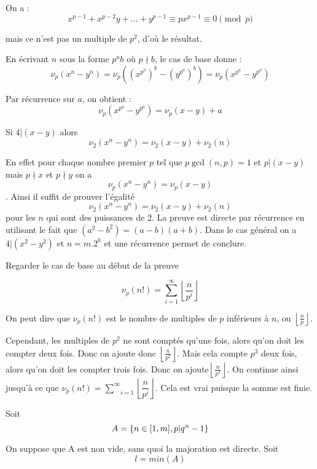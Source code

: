 On a :
\[ x^{p - 1} + x^{p - 2} y + \ldots + y^{p - 1} \equiv px^{p - 1} \equiv 0
   \pmod{p} \]


mais ce n'est pas un multiple de $p^2$, d'o{\`u} le r{\'e}sultat.

En {\'e}crivant $n$ sous la forme $p^a b$ o{\`u} $p \nmid b$, le cas de base
donne :
\[ \nu_p  (x^n - y^n) = \nu_p  ((x^{p^a})^b - (y^{p^a})^b) = \nu_p  (x^{p^a} -
   y^{p^a}) \]


Par r{\'e}currence sur $a$, on obtient :
\[ \nu_p  (x^{p^a} - y^{p^a}) = \nu_p  (x - y) + a \]



Si $4| (x - y)$ alors
\[ \nu_2  (x^n - y^n) = \nu_2 (x - y) + \nu_2 (n) \]


En effet pour chaque nombre premier $p$ tel que $p \gcd (n, p) = 1$ et $p| (x
- y)$ mais $p \nmid x$ et $p \nmid y$ on a
\[ \nu_p  (x^n - y^n) = \nu_p  (x - y) \]
. Ainsi il suffit de prouver l'{\'e}galit{\'e}
\[ \nu_2  (x^n - y^n) = \nu_2 (x - y) + \nu_2 (n) \]
pour les $n$ qui sont des puissances de 2. La preuve est directe par
r{\'e}currence en utilisant le fait que $(a^2 - b^2) = (a - b)  (a + b)$. Dans
le cas g{\'e}n{\'e}ral on a $4| (x^2 - y^2)$ et $n = m. 2^k$ et une
r{\'e}currence permet de conclure.


Regarder le cas de base au d{\'e}but de la preuve

\[ \nu_p (n!) = \sum_{i = 1}^{\infty} \left\lfloor \dfrac{n}{p^i}
   \right\rfloor \]



On peut dire que $\nu_p (n!)$ est le nombre de multiples de $p$ inf{\'e}rieurs
{\`a} $n$, ou $\left\lfloor \frac{n}{p} \right\rfloor$.

Cependant, les multiples de $p^2$ ne sont compt{\'e}s qu'une fois, alors
qu'on doit les compter deux fois. Donc on ajoute donc $\left\lfloor
\frac{n}{p^2} \right\rfloor$. Mais cela compte $p^3$ deux fois, alors qu'on
doit les compter trois fois. Donc on ajoute$\left\lfloor \frac{n}{p^3}
\right\rfloor$. On continue ainsi jusqu'{\`a} ce que $\nu_p (n!) = \underset{i
= 1}{\overset{\infty}{\sum}} \left\lfloor \dfrac{n}{p^i} \right\rfloor$. Cela
est vrai puisque la somme est finie.

Soit
\[ A = \{n \in [1, m], p |  q^n - 1\} \]


On suppose que A est non vide, sans quoi la majoration est directe. Soit
\[ l = min (A) \]


